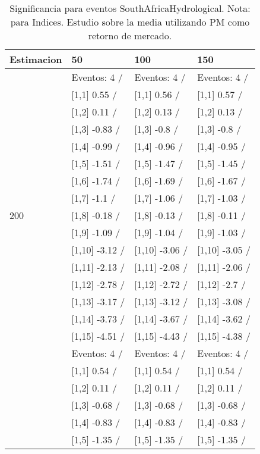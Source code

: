\begin{table}

\caption{Significancia para eventos SouthAfricaHydrological. Nota: para Indices. Estudio sobre la media utilizando PM como retorno de mercado.}
\centering
\begin{tabular}[t]{llll}
\toprule
Estimacion & 50 & 100 & 150\\
\midrule
 & Eventos:  4 / & Eventos:  4 / & Eventos:  4 /\\
 & {}[1,1] 0.55  / & {}[1,1] 0.56  / & {}[1,1] 0.57  /\\
 & {}[1,2] 0.11  / & {}[1,2] 0.13  / & {}[1,2] 0.13  /\\
 & {}[1,3] -0.83  / & {}[1,3] -0.8  / & {}[1,3] -0.8  /\\
 & {}[1,4] -0.99  / & {}[1,4] -0.96  / & {}[1,4] -0.95  /\\
\addlinespace
 & {}[1,5] -1.51  / & {}[1,5] -1.47  / & {}[1,5] -1.45  /\\
 & {}[1,6] -1.74  / & {}[1,6] -1.69  / & {}[1,6] -1.67  /\\
 & {}[1,7] -1.1  / & {}[1,7] -1.06  / & {}[1,7] -1.03  /\\
200 & {}[1,8] -0.18  / & {}[1,8] -0.13  / & {}[1,8] -0.11  /\\
 & {}[1,9] -1.09  / & {}[1,9] -1.04  / & {}[1,9] -1.03  /\\
\addlinespace
 & {}[1,10] -3.12  / & {}[1,10] -3.06  / & {}[1,10] -3.05  /\\
 & {}[1,11] -2.13  / & {}[1,11] -2.08  / & {}[1,11] -2.06  /\\
 & {}[1,12] -2.78  / & {}[1,12] -2.72  / & {}[1,12] -2.7  /\\
 & {}[1,13] -3.17  / & {}[1,13] -3.12  / & {}[1,13] -3.08  /\\
 & {}[1,14] -3.73  / & {}[1,14] -3.67  / & {}[1,14] -3.62  /\\
\addlinespace
 & {}[1,15] -4.51  / & {}[1,15] -4.43  / & {}[1,15] -4.38  /\\
 & Eventos:  4 / & Eventos:  4 / & Eventos:  4 /\\
 & {}[1,1] 0.54  / & {}[1,1] 0.54  / & {}[1,1] 0.54  /\\
 & {}[1,2] 0.11  / & {}[1,2] 0.11  / & {}[1,2] 0.11  /\\
 & {}[1,3] -0.68  / & {}[1,3] -0.68  / & {}[1,3] -0.68  /\\
\addlinespace
 & {}[1,4] -0.83  / & {}[1,4] -0.83  / & {}[1,4] -0.83  /\\
 & {}[1,5] -1.35  / & {}[1,5] -1.35  / & {}[1,5] -1.35  /\\

\end{tabular}
\end{table}

